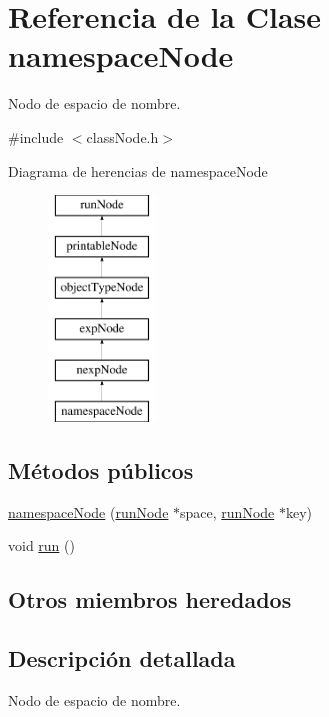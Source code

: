 \hypertarget{classnamespaceNode}{\section{Referencia de la Clase namespace\-Node}
\label{classnamespaceNode}
}


Nodo de espacio de nombre.  




{\ttfamily \#include $<$class\-Node.\-h$>$}

Diagrama de herencias de namespace\-Node\begin{figure}[H]
\begin{center}
\leavevmode
\includegraphics[height=6.000000cm]{classnamespaceNode}
\end{center}
\end{figure}
\subsection*{Métodos públicos}
\begin{DoxyCompactItemize}
\item 
\hyperlink{classnamespaceNode_acdcf5f6fd3fc2e8c126a2417e67298b8}{namespace\-Node} (\hyperlink{classrunNode}{run\-Node} $\ast$space, \hyperlink{classrunNode}{run\-Node} $\ast$key)
\item 
void \hyperlink{classnamespaceNode_a770dfe081c011399490fbef5e4f83037}{run} ()
\end{DoxyCompactItemize}
\subsection*{Otros miembros heredados}


\subsection{Descripción detallada}
Nodo de espacio de nombre. 

